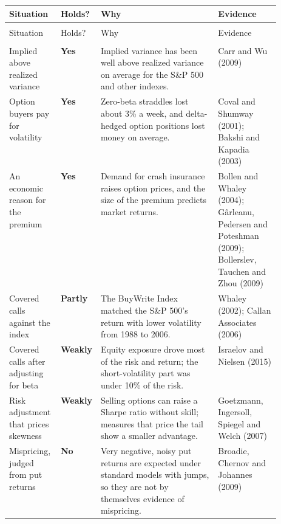 {\small
\begin{longtable}{@{}>{\raggedright\arraybackslash}p{0.19\linewidth}>{\raggedright\arraybackslash}p{0.10\linewidth}>{\raggedright\arraybackslash}p{}>{\raggedright\arraybackslash}p{0.23\linewidth}@{}}
\toprule
Situation & Holds? & Why & Evidence \\
\midrule
\endfirsthead
\multicolumn{4}{@{}l}{\emph{(continued)}} \\
\toprule
Situation & Holds? & Why & Evidence \\
\midrule
\endhead
\midrule
\multicolumn{4}{r@{}}{\emph{(continued on the next page)}} \\
\endfoot
\bottomrule
\endlastfoot
Implied above realized variance & \textbf{Yes} & Implied variance has been well above realized variance on average for the S\&P 500 and other indexes. & Carr and Wu (2009) \\
\addlinespace[3pt]
Option buyers pay for volatility & \textbf{Yes} & Zero-beta straddles lost about 3\% a week, and delta-hedged option positions lost money on average. & Coval and Shumway (2001); Bakshi and Kapadia (2003) \\
\addlinespace[3pt]
An economic reason for the premium & \textbf{Yes} & Demand for crash insurance raises option prices, and the size of the premium predicts market returns. & Bollen and Whaley (2004); G\^arleanu, Pedersen and Poteshman (2009); Bollerslev, Tauchen and Zhou (2009) \\
\addlinespace[3pt]
Covered calls against the index & \textbf{Partly} & The BuyWrite Index matched the S\&P 500's return with lower volatility from 1988 to 2006. & Whaley (2002); Callan Associates (2006) \\
\addlinespace[3pt]
Covered calls after adjusting for beta & \textbf{Weakly} & Equity exposure drove most of the risk and return; the short-volatility part was under 10\% of the risk. & Israelov and Nielsen (2015) \\
\addlinespace[3pt]
Risk adjustment that prices skewness & \textbf{Weakly} & Selling options can raise a Sharpe ratio without skill; measures that price the tail show a smaller advantage. & Goetzmann, Ingersoll, Spiegel and Welch (2007) \\
\addlinespace[3pt]
Mispricing, judged from put returns & \textbf{No} & Very negative, noisy put returns are expected under standard models with jumps, so they are not by themselves evidence of mispricing. & Broadie, Chernov and Johannes (2009) \\
\end{longtable}
}

